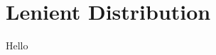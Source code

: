 
\chapter{Lenient Distribution} 
\label{appendix_lenient}
\ifpdf
    \graphicspath{{Appendix4/Figs/Raster/}{Appendix4/Figs/PDF/}{Appendix4/Figs/}}
\else
    \graphicspath{{Appendix4/Figs/Vector/}{Appendix4/Figs/}}
\fi

Hello
